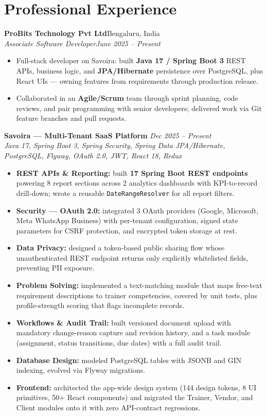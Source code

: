 \documentclass[a4paper,10pt]{article}
\newcommand{\heading}[2]{\textbf{#1}\hfill #2\\[1pt]}
\newcommand{\subheading}[2]{\textit{#1}\hfill \textit{#2}\\[1pt]}
\begin{document}
\section{Professional Experience}

\heading{ProBits Technology Pvt Ltd}{Bengaluru, India}
\subheading{Associate Software Developer}{June 2025 -- Present}
\begin{itemize}
  \item Full-stack developer on Savoira: built \textbf{Java 17 / Spring Boot 3} REST APIs, business
        logic, and \textbf{JPA/Hibernate} persistence over PostgreSQL, plus React UIs --- owning
        features from requirements through production release.
  \item Collaborated in an \textbf{Agile/Scrum} team through sprint planning, code reviews, and pair
        programming with senior developers; delivered work via Git feature branches and pull requests.
\end{itemize}

\vspace{4pt}
\textbf{Savoira --- Multi-Tenant SaaS Platform} \hfill \textit{Dec 2025 -- Present}\\[1pt]
{\small\textit{Java 17, Spring Boot 3, Spring Security, Spring Data JPA/Hibernate, PostgreSQL, Flyway,
OAuth 2.0, JWT, React 18, Redux}}
\begin{itemize}
  \item \textbf{REST APIs \& Reporting:} built \textbf{17 Spring Boot REST endpoints} powering 8 report
        sections across 2 analytics dashboards with KPI-to-record drill-down; wrote a reusable
        \texttt{DateRangeResolver} for all report filters.
  \item \textbf{Security --- OAuth 2.0:} integrated 3 OAuth providers (Google, Microsoft, Meta WhatsApp
        Business) with per-tenant configuration, signed state parameters for CSRF protection, and
        encrypted token storage at rest.
  \item \textbf{Data Privacy:} designed a token-based public sharing flow whose unauthenticated REST
        endpoint returns only explicitly whitelisted fields, preventing PII exposure.
  \item \textbf{Problem Solving:} implemented a text-matching module that maps free-text requirement
        descriptions to trainer competencies, covered by unit tests, plus profile-strength scoring
        that flags incomplete records.
  \item \textbf{Workflows \& Audit Trail:} built versioned document upload with mandatory
        change-reason capture and revision history, and a task module (assignment, status
        transitions, due dates) with a full audit trail.
  \item \textbf{Database Design:} modeled PostgreSQL tables with JSONB and GIN indexing, evolved via
        Flyway migrations.
  \item \textbf{Frontend:} architected the app-wide design system (144 design tokens, 8 UI primitives,
        50+ React components) and migrated the Trainer, Vendor, and Client modules onto it with zero
        API-contract regressions.
\end{itemize}
\end{document}
